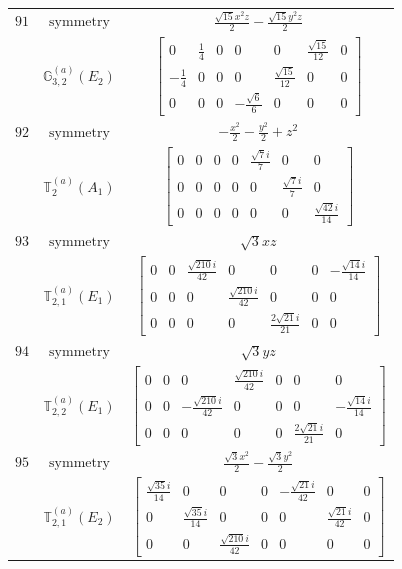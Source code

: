 \documentclass[fleqn,8pt,landscape]{jsarticle}
\begin{document}
\begin{longtable}{ccc}
$ 91 $ & $ \text{symmetry} $ & $ \frac{\sqrt{15} x^{2} z}{2} - \frac{\sqrt{15} y^{2} z}{2} $ \\
$  $ & $ \mathbb{G}_{3,2}^{(a)}(E_{2}) $ & $ \begin{bmatrix} 0 & \frac{1}{4} & 0 & 0 & 0 & \frac{\sqrt{15}}{12} & 0 \\ - \frac{1}{4} & 0 & 0 & 0 & \frac{\sqrt{15}}{12} & 0 & 0 \\ 0 & 0 & 0 & - \frac{\sqrt{6}}{6} & 0 & 0 & 0 \end{bmatrix} $ \\ \hline
$ 92 $ & $ \text{symmetry} $ & $ - \frac{x^{2}}{2} - \frac{y^{2}}{2} + z^{2} $ \\
$  $ & $ \mathbb{T}_{2}^{(a)}(A_{1}) $ & $ \begin{bmatrix} 0 & 0 & 0 & 0 & \frac{\sqrt{7} i}{7} & 0 & 0 \\ 0 & 0 & 0 & 0 & 0 & \frac{\sqrt{7} i}{7} & 0 \\ 0 & 0 & 0 & 0 & 0 & 0 & \frac{\sqrt{42} i}{14} \end{bmatrix} $ \\ \hline
$ 93 $ & $ \text{symmetry} $ & $ \sqrt{3} x z $ \\
$  $ & $ \mathbb{T}_{2,1}^{(a)}(E_{1}) $ & $ \begin{bmatrix} 0 & 0 & \frac{\sqrt{210} i}{42} & 0 & 0 & 0 & - \frac{\sqrt{14} i}{14} \\ 0 & 0 & 0 & \frac{\sqrt{210} i}{42} & 0 & 0 & 0 \\ 0 & 0 & 0 & 0 & \frac{2 \sqrt{21} i}{21} & 0 & 0 \end{bmatrix} $ \\ \hline
$ 94 $ & $ \text{symmetry} $ & $ \sqrt{3} y z $ \\
$  $ & $ \mathbb{T}_{2,2}^{(a)}(E_{1}) $ & $ \begin{bmatrix} 0 & 0 & 0 & \frac{\sqrt{210} i}{42} & 0 & 0 & 0 \\ 0 & 0 & - \frac{\sqrt{210} i}{42} & 0 & 0 & 0 & - \frac{\sqrt{14} i}{14} \\ 0 & 0 & 0 & 0 & 0 & \frac{2 \sqrt{21} i}{21} & 0 \end{bmatrix} $ \\ \hline
$ 95 $ & $ \text{symmetry} $ & $ \frac{\sqrt{3} x^{2}}{2} - \frac{\sqrt{3} y^{2}}{2} $ \\
$  $ & $ \mathbb{T}_{2,1}^{(a)}(E_{2}) $ & $ \begin{bmatrix} \frac{\sqrt{35} i}{14} & 0 & 0 & 0 & - \frac{\sqrt{21} i}{42} & 0 & 0 \\ 0 & \frac{\sqrt{35} i}{14} & 0 & 0 & 0 & \frac{\sqrt{21} i}{42} & 0 \\ 0 & 0 & \frac{\sqrt{210} i}{42} & 0 & 0 & 0 & 0 \end{bmatrix} $ \\ \hline

\end{longtable}
\end{document}
